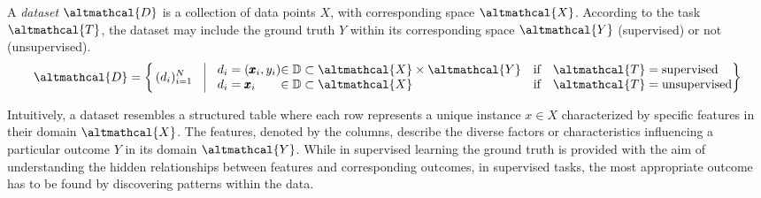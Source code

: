 \begin{definition}[Dataset]\label{def:dataset}
    A \textit{dataset} $\altmathcal{D}$ is a collection of data points $X$, with corresponding space $\altmathcal{X}$.
    According to the task $\altmathcal{T}$, the dataset may include the ground truth $Y$ within its corresponding space $\altmathcal{Y}$ (supervised) or not (unsupervised).
    \begin{equation*}\label{eq:dataset}
        \altmathcal{D} = \left\lbrace\,
        (d_i)_{i=1}^N  \quad \begin{array}{|@{}l@{}l@{\quad}l@{}}
            \quad d_i = (\pmb{x}_i, y_i) & \in \mathbb{D} \subset \altmathcal{X} \times \altmathcal{Y} & \text{{if }}~~\altmathcal{T} = \text{{supervised}} \\
            \quad d_i = \pmb{x}_i & \in \mathbb{D} \subset \altmathcal{X} & \text{{if }}~~\altmathcal{T} = \text{{unsupervised}}
        \end{array}
        \right\rbrace
    \end{equation*}
\end{definition}

Intuitively, a dataset resembles a structured table where each row represents a unique instance $x \in X$ characterized by specific features in their domain $\altmathcal{X}$.
The features, denoted by the columns, describe the diverse factors or characteristics influencing a particular outcome $Y$ in its domain $\altmathcal{Y}$.
While in supervised learning the ground truth is provided with the aim of understanding the hidden relationships between features and corresponding outcomes, in supervised tasks, the most appropriate outcome has to be found by discovering patterns within the data.

